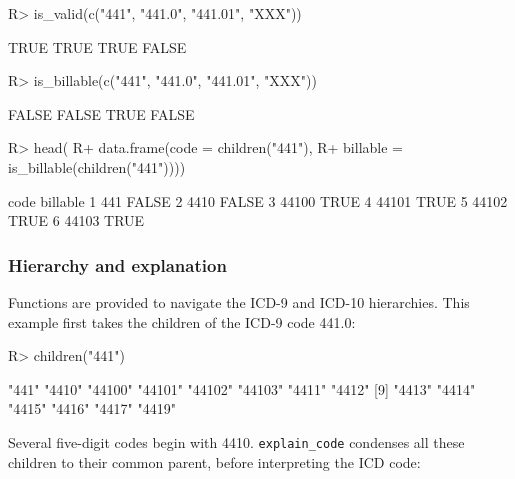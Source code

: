 \documentclass[article]{jss}
\begin{document}
\begin{CodeChunk}

\begin{CodeInput}
R> is_valid(c("441", "441.0", "441.01", "XXX"))
\end{CodeInput}

\begin{CodeOutput}
[1]  TRUE  TRUE  TRUE FALSE
\end{CodeOutput}

\begin{CodeInput}
R> is_billable(c("441", "441.0", "441.01", "XXX"))
\end{CodeInput}

\begin{CodeOutput}
[1] FALSE FALSE  TRUE FALSE
\end{CodeOutput}

\begin{CodeInput}
R> head(
R+   data.frame(code = children("441"),
R+              billable = is_billable(children("441"))))
\end{CodeInput}

\begin{CodeOutput}
   code billable
1   441    FALSE
2  4410    FALSE
3 44100     TRUE
4 44101     TRUE
5 44102     TRUE
6 44103     TRUE
\end{CodeOutput}
\end{CodeChunk}

\hypertarget{hierarchy-and-explanation}{%
\subsubsection{Hierarchy and
explanation}\label{hierarchy-and-explanation}}

Functions are provided to navigate the ICD-9 and ICD-10 hierarchies.
This example first takes the children of the ICD-9 code 441.0:

\begin{CodeChunk}

\begin{CodeInput}
R> children("441")
\end{CodeInput}

\begin{CodeOutput}
 [1] "441"   "4410"  "44100" "44101" "44102" "44103" "4411"  "4412" 
 [9] "4413"  "4414"  "4415"  "4416"  "4417"  "4419" 
\end{CodeOutput}
\end{CodeChunk}

Several five-digit codes begin with 4410. \texttt{explain\_code}
condenses all these children to their common parent, before interpreting
the ICD code:
\end{document}
